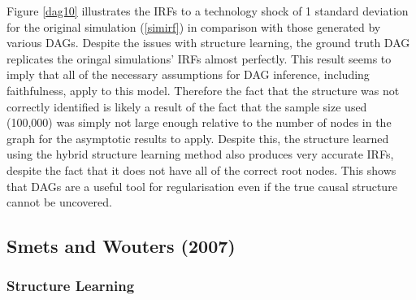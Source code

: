 \documentclass{article}
\begin{document}
Figure \ref{dag10} illustrates the IRFs to a technology shock of 1 standard deviation for the original simulation (\ref{simirf}) in comparison with those generated by various DAGs. Despite the issues with structure learning, the ground truth DAG replicates the oringal simulations' IRFs almost perfectly. This result seems to imply that all of the necessary assumptions for DAG inference, including faithfulness, apply to this model. Therefore the fact that the structure was not correctly identified is likely a result of the fact that the sample size used (100,000) was simply not large enough relative to the number of nodes in the graph for the asymptotic results to apply. Despite this, the structure learned using the hybrid structure learning method also produces very accurate IRFs, despite the fact that it does not have all of the correct root nodes. This shows that DAGs are a useful tool for regularisation even if the true causal structure cannot be uncovered.

\subsection{Smets and Wouters (2007)}

\subsubsection{Structure Learning}
\end{document}
